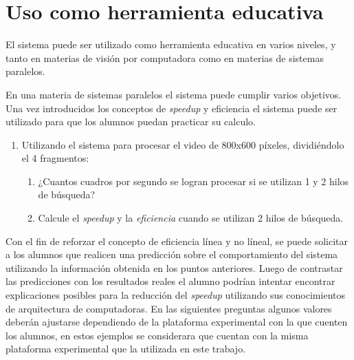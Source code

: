 
\section{Uso como herramienta educativa}

\label{usoEducativo}

El sistema puede ser utilizado como herramienta educativa en varios niveles, y
tanto en materias de visión por computadora como en materias de sistemas
paralelos.

En una materia de sistemas paralelos el sistema puede cumplir varios objetivos.
Una vez introducidos los conceptos de \emph{speedup} y eficiencia el sistema
puede ser utilizado para que los alumnos puedan practicar su calculo.

\begin{enumerate}

	\item{Utilizando el sistema para procesar el video de 800x600 píxeles,
		dividiéndolo el 4 fragmentos:

\begin{enumerate}

	\item{¿Cuantos cuadros por segundo se logran procesar si se utilizan 1 y
		2 hilos de búsqueda?}

	\item{Calcule el \emph{speedup} y la \emph{eficiencia} cuando se
		utilizan 2 hilos de búsqueda.}

\end{enumerate}}

\end{enumerate}

Con el fin de reforzar el concepto de eficiencia línea y no líneal, se puede
solicitar a los alumnos que realicen una predicción sobre el comportamiento del
sistema utilizando la información obtenida en los puntos anteriores. Luego de
contrastar las predicciones con los resultados reales el alumno podrían intentar
encontrar explicaciones posibles para la reducción del \emph{speedup} utilizando
sus conocimientos de arquitectura de computadoras. En las siguientes preguntas
algunos valores deberán ajustarse dependiendo de la plataforma experimental con
la que cuenten los alumnos, en estos ejemplos se considerara que cuentan con la
misma plataforma experimental que la utilizada en este trabajo.

